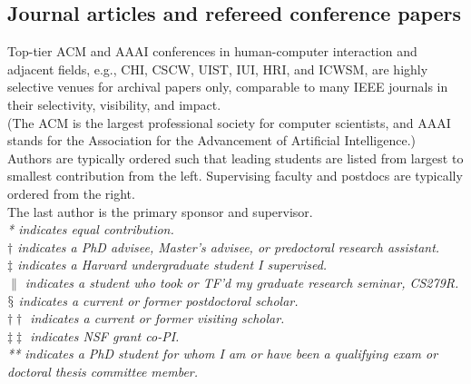 \documentclass[10pt, a4paper]{article}
\newcommand{\years}[1]{\marginnote{\normalsize #1}}
\begin{document}
\subsection*{Journal articles and refereed conference papers}
\noindent
Top-tier ACM and AAAI conferences in human-computer interaction and adjacent fields, e.g., CHI, CSCW, UIST, IUI, HRI, and ICWSM, are highly selective venues for archival papers only, comparable to many IEEE journals in their selectivity, visibility, and impact.\\[0.1cm]
(The ACM is the largest professional society for computer scientists, and AAAI stands for the Association for the Advancement of Artificial Intelligence.)\\[0.1cm]
Authors are typically ordered such that leading students are listed from largest to smallest contribution from the left. Supervising faculty and postdocs are typically ordered from the right. \\
The last author is the primary sponsor and supervisor.\\[0.2cm] %
\emph{* indicates equal contribution.}\\
\emph{$\dagger$ indicates a PhD advisee, Master's advisee, or predoctoral research assistant.}\\
\emph{$\ddagger$ indicates a Harvard undergraduate student I supervised.}\\
\emph{$\|$ indicates a student who took or TF'd my graduate research seminar, CS279R.}\\
\emph{$\mathsection$ indicates a current or former postdoctoral scholar.}\\
\emph{$\dagger\dagger$ indicates a current or former visiting scholar.}\\
\emph{$\ddagger\ddagger$ indicates NSF grant co-PI.}\\
\emph{** indicates a PhD student for whom I am or have been a qualifying exam or doctoral thesis committee member.}
\end{document}
